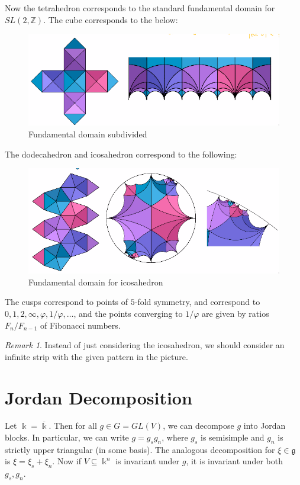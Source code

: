 \documentclass[leqno, openany]{memoir}
\theoremstyle{definition}
\theoremstyle{remark}
\newtheorem{rmk}[thm]{Remark}
\theoremstyle{plain}
\theoremstyle{definition}
\theoremstyle{remark}
\newcommand{\Z}{\mathbb{Z}}
\renewcommand{\k}{\Bbbk}
\newcommand{\mf}[1]{\mathfrak{#1}}
\newcommand{\ol}[1]{\overline{#1}}
\begin{document}
Now the tetrahedron corresponds to the standard fundamental domain for $SL(2, \Z)$. The cube corresponds to the below:
\begin{figure}[H]
    \centering
    \includegraphics[width=0.8\linewidth]{squarefd}
    \caption{Fundamental domain subdivided}%
    \label{fig:squarefd}
\end{figure}
The dodecahedron and icosahedron correspond to the following:
\begin{figure}[H]
    \centering
    \includegraphics[width=0.8\linewidth]{icosafd}
    \caption{Fundamental domain for icosahedron}%
    \label{fig:icosafd}
\end{figure}
The cusps correspond to points of $5$-fold symmetry, and correspond to $0, 1, 2, \infty, \varphi, 1/\varphi, \ldots$, and the points converging to $1/\varphi$ are given by ratios $F_n/F_{n-1}$ of Fibonacci numbers.

\begin{rmk}
    Instead of just considering the icosahedron, we should consider an infinite strip with the given pattern in the picture.
\end{rmk}

\section{Jordan Decomposition}%
\label{sec:jordan_decomposition}

Let $\k = \ol{\k}$. Then for all $g \in G = GL(V)$, we can decompose $g$ into Jordan blocks. In particular, we can write $g = g_s g_n$, where $g_s$ is semisimple and $g_n$ is strictly upper triangular (in some basis). The analogous decomposition for $\xi \in \mf{g}$ is $\xi = \xi_s + \xi_n$. Now if $V \subseteq \k^n$ is invariant under $g$, it is invariant under both $g_s, g_n$.
\end{document}

